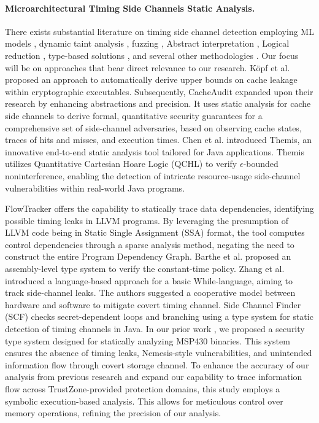 \paragraph{Microarchitectural Timing Side Channels Static Analysis.} There exists substantial literature on timing side channel detection employing ML models \cite{MLforSC, chiappetta2016realtime, allaf2017comparison}, dynamic taint analysis \cite{graa2017detection}, fuzzing \cite{nilizadeh2018diffuzz}, Abstract interpretation \cite{kopf2012automatic, doychev2015cacheaudit}, Logical reduction \cite{chen2017precise}, type-based solutions \cite{MantelAVR, scfmsp, barthe2014system, rodrigues2016sparse, zhang2012languagebased, lux2011tool}, and several other methodologies \cite{timingattack, akram2020sherlock, szefer2019survey}. Our focus will be on approaches that bear direct relevance to our research. Köpf et al. \cite{kopf2012automatic} proposed an approach to automatically derive upper bounds on cache leakage within cryptographic executables. Subsequently, CacheAudit \cite{doychev2015cacheaudit} expanded upon their research by enhancing abstractions and precision. It uses static analysis for cache side channels to derive formal, quantitative security guarantees for a comprehensive set of side-channel adversaries, based on observing cache states, traces of hits and misses, and execution times. Chen et al. \cite{chen2017precise} introduced Themis, an innovative end-to-end static analysis tool tailored for Java applications. Themis utilizes Quantitative Cartesian Hoare Logic (QCHL) to verify $\epsilon$-bounded noninterference, enabling the detection of intricate resource-usage side-channel vulnerabilities within real-world Java programs. 

FlowTracker \cite{rodrigues2016sparse} offers the capability to statically trace data dependencies, identifying possible timing leaks in LLVM programs. By leveraging the presumption of LLVM code being in Static Single Assignment (SSA) format, the tool computes control dependencies through a sparse analysis method, negating the need to construct the entire Program Dependency Graph. Barthe et al. \cite{barthe2014system} proposed an assembly-level type system to verify the constant-time policy. Zhang et al. \cite{zhang2012languagebased} introduced a language-based approach for a basic While-language, aiming to track side-channel leaks. The authors suggested a cooperative model between hardware and software to mitigate covert timing channel. Side Channel Finder (\gls{SCF}) \cite{lux2011tool} checks secret-dependent loops and branching using a type system for static detection of timing channels in Java. In our prior work \cite{scfmsp}, we proposed a security type system designed for statically analyzing MSP430 binaries. This system ensures the absence of timing leaks, Nemesis-style vulnerabilities, and unintended information flow through covert storage channel. To enhance the accuracy of our analysis from previous research and expand our capability to trace information flow across TrustZone-provided protection domains, this study employs a symbolic execution-based analysis. This allows for meticulous control over memory operations, refining the precision of our analysis.

